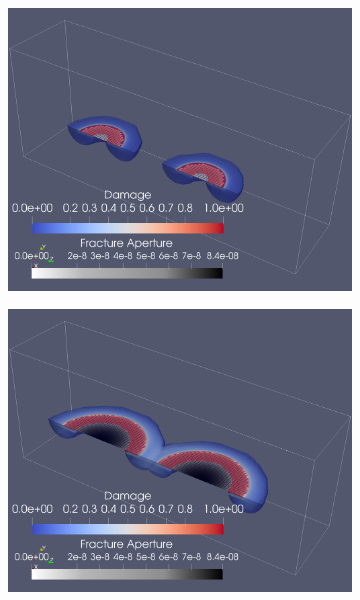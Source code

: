 \begin{figure}[h]
\begin{subfigure}{.45\textwidth}
  \centering
  \includegraphics[width=\linewidth]{Chapter4/figures/merging/merge_t_1(1).png}
  \caption{}
  \label{fig:merge_t_0}
\end{subfigure}%
\hspace{1cm}
\begin{subfigure}{.45\textwidth}
  \centering
  \includegraphics[width=\linewidth]{Chapter4/figures/merging/merge_t_17(1).png}
  \caption{}
  \label{fig:merge_t_1}
\end{subfigure}%


\end{figure}
